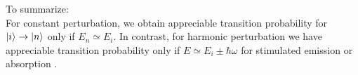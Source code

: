 To summarize:\\
	For constant perturbation, we obtain appreciable transition probability for $\ket{i} \rightarrow \ket{n}$ only if $E_n \simeq E_i$. In contrast, for harmonic perturbation we have appreciable transition probability only if $E \simeq E_i \pm \hbar\omega$ for stimulated emission or absorption .